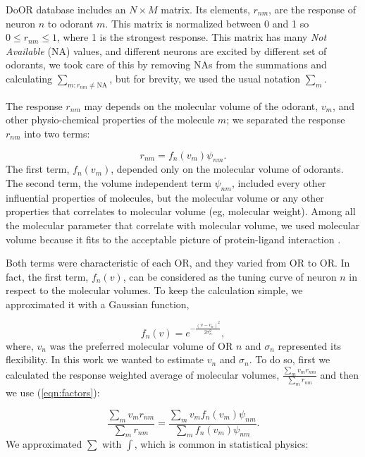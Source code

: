 \documentclass[11pt]{paper} %
\begin{document}
DoOR database includes an $N\times M$ matrix. 
Its elements, $r_{nm}$, are the response of neuron $n$ to odorant $m$. 
This matrix is normalized between 0 and 1 so $0 \le r_{nm} \le 1$, where 1 is the strongest response.
This matrix has many {\it Not Available} (NA) values, 
and different neurons are excited by different set of odorants, 
we took care of this by removing NAs from the summations and calculating $\sum_{m: r_{nm} \neq \text{NA}}$, 
but for brevity, we used the usual notation $\sum_m$.

The response $r_{nm}$ may depends on the molecular volume of the odorant, $v_m$, 
and other physio-chemical properties of the molecule $m$; 
we separated the response $r_{nm}$ into two terms:

\begin{equation}
	r_{nm} = f_n(v_m) \psi_{nm}.
	\label{eqn:factors}
\end{equation}
The first term, $f_n(v_m)$, depended only on the molecular volume of odorants.
The second term, the volume independent term $\psi_{nm}$, included every other influential properties of molecules, 
but the molecular volume or any other properties that correlates to molecular volume (eg, molecular weight).
Among all the molecular parameter that correlate with molecular volume, 
we used molecular volume because it  fits to the acceptable picture of protein-ligand interaction \cite{fig:binding-pocket}.

Both terms were characteristic of each OR, and they varied from OR to OR.
In fact, the first term, $f_n(v)$, can be considered as the tuning curve of neuron $n$ in respect to the molecular volumes. 
To keep the calculation simple, we approximated it with a Gaussian function,  

\begin{equation}
	\displaystyle f_n(v) = e^{-\frac{(v-v_n)^2}{2\sigma^2_n}}, 
	\label{eqn:volume-dependence}
\end{equation}
where, $v_n$ was the preferred molecular volume of OR $n$ and $\sigma_n$ represented its flexibility. 
In this work we wanted to estimate $v_n$ and $\sigma_n$. 
To do so, first we calculated the response weighted average of molecular volumes, 
$\frac{\sum_{m} v_m r_{nm}}{\sum_{m} r_{nm}}$ and then we use (\ref{eqn:factors}):

\begin{equation}
	\frac{\displaystyle \sum_{m} v_m r_{nm}}{\displaystyle \sum_{m} r_{nm}} = \frac{\displaystyle \sum_{m} v_m f_n(v_m) \psi_{nm}}{\displaystyle \sum_{m} f_n(v_m) \psi_{nm}}.
	\label{eqn:sta}
\end{equation}
We approximated $\sum$ with $\int$, which is common in statistical physics:
\end{document}
